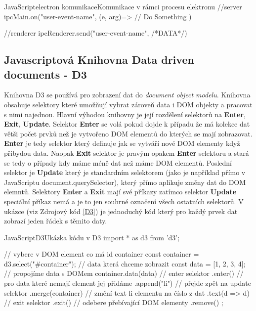 \documentclass[
  biblatex,
  glossaries,
  index
]{kidiplom}
\begin{document}
\begin{kicode}{JavaScript}{electron komunikace}{Komunikace v rámci procesu elektronu}
  //server
  ipcMain.on("user-event-name", (e, arg)=>{
    // Do Something
  })

  //renderer
  ipcRenderer.send("user-event-name", {/*DATA*/})
\end{kicode}

\subsection{Javascriptová Knihovna Data driven documents - D3}
Knihovna D3 se používá pro zobrazení dat do 
\textit{document object modelu}.
Knihovna obsahuje selektory které umožňují vybrat zároveň data 
i DOM objekty a pracovat s nimi najednou. Hlavní výhodou knihovny 
je její rozdělení selektorů na \textbf{Enter}, \textbf{Exit}, \textbf{Update}.
Selektor \textbf{Enter} se volá pokud dojde k případu že má kolekce 
dat větši počet prvků než je vytvořeno DOM elementů do kterých se mají zobrazovat.
\textbf{Enter} je tedy selektor který definuje jak se vytváří nové DOM elementy 
když přibydou data. Naopak \textbf{Exit} selektor je pravým opakem \textbf{Enter}
selektoru a stará se tedy o případy kdy máme méně dat než máme DOM elementů.
Poslední selektor je \textbf{Update} který je standardním selektorem 
(jako je například přímo v JavaScriptu document.querySelector), který přímo 
aplikuje změny dat do DOM elemntů. Selektory \textbf{Enter} a \textbf{Exit} 
mají své příkazy zatímco selektor \textbf{Update} speciální příkaz nemá a je to jen 
souhrné označení všech ostatních selektorů. V ukázce (viz Zdrojový kód \ref{D3}) je
jednoduchý kód který pro každý prvek dat zobrazí jeden řádek s těmito daty.

\begin{kicode}{JavaScript}{D3}{Ukázka kódu v D3}
import * as d3 from 'd3';

// vybere v DOM element co má id container
const container = d3.select("#container");
// data která chceme zobrazit 
const data = [1, 2, 3, 4];
// propojíme data s DOMem
container.data(data)
    // enter selektor
    .enter()
    // pro data které nemají element jej přidáme
    .append("li")
    // přejde zpět na update selektor
    .merge(container)
    // změní text li elementu na číslo z dat
    .text(d => d)
    // exit selektor
    .exit()
    // odebere přebívající DOM elementy
    .remove()
    ;
  
\end{kicode}
\end{document}
